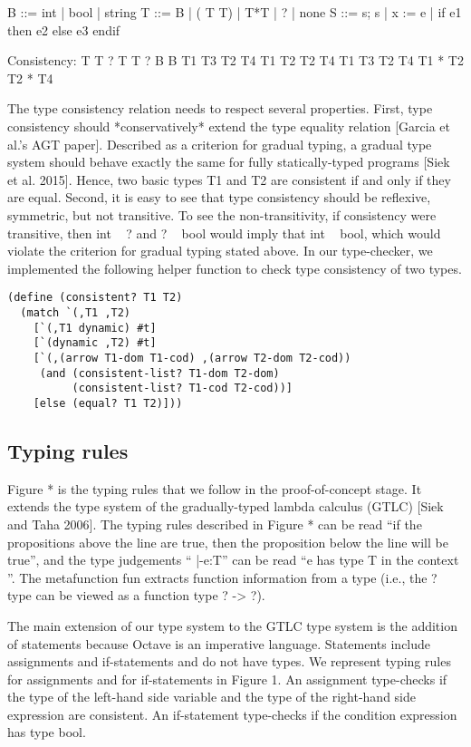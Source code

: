 B ::= int | bool | string
T ::= B | ( T T) | T*T | ? | none
S ::= s; s | x := e | if e1 then e2 else e3 endif

Consistency: T  T
?  T  T  ?  B  B  
T1  T3  T2  T4 T1  T2  T2  T4    T1  T3  T2  T4 T1 * T2  T2 * T4   

The type consistency relation needs to respect several properties. First, type consistency should *conservatively* extend the type equality relation [Garcia et al.’s AGT paper]. Described as a criterion for gradual typing, a gradual type system should behave exactly the same for fully statically-typed programs [Siek et al. 2015]. Hence, two basic types T1 and T2 are consistent if and only if they are equal. Second, it is easy to see that type consistency should be reflexive, symmetric, but not transitive. To see the non-transitivity, if consistency were transitive, then int ~ ? and ? ~ bool would imply that int ~ bool, which would violate the criterion for gradual typing stated above. In our type-checker, we implemented the following helper function to check type consistency of two types.

\begin{lstlisting}
(define (consistent? T1 T2)
  (match `(,T1 ,T2)
    [`(,T1 dynamic) #t]
    [`(dynamic ,T2) #t]
    [`(,(arrow T1-dom T1-cod) ,(arrow T2-dom T2-cod))
     (and (consistent-list? T1-dom T2-dom)
          (consistent-list? T1-cod T2-cod))]
    [else (equal? T1 T2)]))
\end{lstlisting}

\subsection{Typing rules}
Figure * is the typing rules that we follow in the proof-of-concept stage. It extends the type system of the gradually-typed lambda calculus (GTLC) [Siek and Taha 2006]. The typing rules described in Figure * can be read “if the propositions above the line are true, then the proposition below the line will be true”, and the type judgements “ |-e:T” can be read “e has type T in the context ”. The metafunction fun extracts function information from a type (i.e., the ? type can be viewed as a function type ? -> ?).

The main extension of our type system to the GTLC type system is the addition of statements because Octave is an imperative language. Statements include assignments and if-statements and do not have types. We represent typing rules for assignments and for if-statements in Figure 1. An assignment type-checks if the type of the left-hand side variable and the type of the right-hand side expression are consistent. An if-statement type-checks if the condition expression has type bool.






